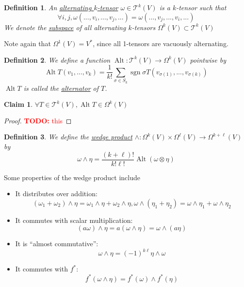 \documentclass{article}
\newtheorem{definition}{Definition}
\newtheorem{claim}{Claim}
\DeclareMathOperator{\Sgn}{sgn}
\DeclareMathOperator{\Alt}{Alt}
\newcommand{\mc}[1]{\mathcal{#1}}
\newcommand{\TODO}[1]{\textcolor{red}{\textbf{TODO:} #1}}
\begin{document}
\begin{definition}
  An \underline{alternating \(k\)-tensor} \(\omega \in \mc{T}^k(V)\) is a \(k\)-tensor such that
  \begin{equation}
    \forall i, j, \omega(...,v_i,...,v_j,...) = \omega(...,v_j,...,v_i,...)
  \end{equation}
  We denote the \underline{subspace} of all alternating \(k\)-tensors \(\Omega^k(V) \subset \mc{T}^k(V)\)
\end{definition}
Note again that \(\Omega^1(V) = V^*\), since all 1-tensors are vacuously alternating.
\begin{definition}
  We define a function \(\Alt: \mc{T}^k(V) \to \Omega^k(V)\) pointwise by
  \begin{equation}
    \Alt T(v_1,...,v_k) = \frac{1}{k!}\sum_{\sigma \in S_k}\Sgn\sigma T(v_{\sigma(1)},...,v_{\sigma(k)})
  \end{equation}
  \(\Alt T\) is called the \underline{alternator} of \(T\).
\end{definition}
\begin{claim}
  \(\forall T \in \mc{T}^k(V), \Alt T \in \Omega^k(V)\)
\end{claim}
\begin{proof}
  \TODO{this}
\end{proof}
\begin{definition}
  We define the \underline{wedge product} \(\wedge : \Omega^k(V) \times \Omega^\ell(V) \to \Omega^{k + \ell}(V)\) by
  \begin{equation}
    \omega \wedge \eta = \frac{(k + \ell)!}{k!\ell!}\Alt(\omega \otimes \eta)
  \end{equation}
\end{definition}
Some properties of the wedge product include
\begin{itemize}

  \item It distributes over addition:
  \begin{equation}
    (\omega_1 + \omega_2) \wedge \eta = \omega_1 \wedge \eta + \omega_2 \wedge \eta, \omega \wedge(\eta_1 + \eta_2) = \omega \wedge \eta_1 + \omega \wedge \eta_2
  \end{equation}

  \item It commutes with scalar multiplication:
  \begin{equation}
    (a\omega) \wedge \eta = a(\omega \wedge \eta) = \omega \wedge (a\eta)
  \end{equation}

  \item It is ``almost commutative'':
  \begin{equation}
    \omega \wedge \eta = (-1)^{k\ell}\eta \wedge \omega
  \end{equation}

  \item It commutes with \(f^*\):
  \begin{equation}
    f^*(\omega \wedge \eta) = f^*(\omega) \wedge f^*(\eta)
  \end{equation}

\end{itemize}
\end{document}
